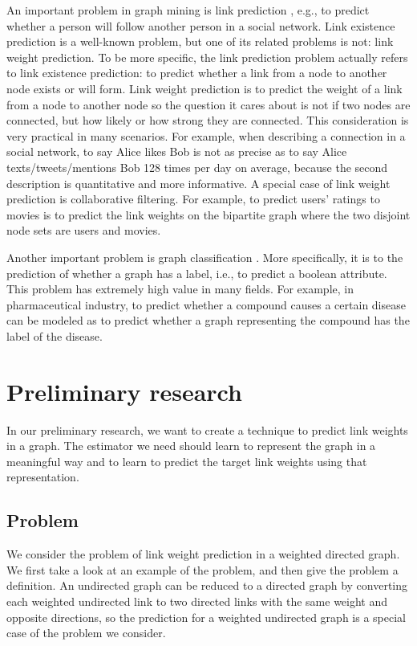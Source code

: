 \documentclass{article}
\begin{document}
An important problem in graph mining is link prediction \cite{liben2007link},
e.g., to predict whether a person will follow another person in a social network.
Link existence prediction is a well-known problem,
but one of its related problems is not: link weight prediction.
To be more specific,
the link prediction problem actually refers to link existence prediction:
to predict whether a link from a node to another node exists or will form.
Link weight prediction is
to predict the weight of a link from a node to another node
so the question it cares about is not if two nodes are connected,
but how likely or how strong they are connected.
This consideration is very practical in many scenarios.
For example, when describing a connection in a social network,
to say Alice likes Bob is not as precise as
to say Alice texts/tweets/mentions Bob 128 times per day on average,
because the second description is quantitative and more informative.
A special case of link weight prediction is collaborative filtering.
For example, to predict users' ratings to movies
is to predict the link weights on the bipartite graph
where the two disjoint node sets are users and movies.

Another important problem is graph classification \cite{duda2012pattern}.
More specifically, it is to the prediction of whether a graph has a label,
i.e., to predict a boolean attribute.
This problem has extremely high value in many fields.
For example, in pharmaceutical industry,
to predict whether a compound causes a certain disease
can be modeled as to predict whether a graph representing the compound
has the label of the disease.

\section{Preliminary research}
In our preliminary research,
we want to create a technique to predict link weights in a graph.
The estimator we need should learn to represent the graph in a meaningful way
and to learn to predict the target link weights using that representation.

\subsection{Problem}
We consider the problem of link weight prediction in a weighted directed graph.
We first take a look at an example of the problem,
and then give the problem a definition.
An undirected graph can be reduced to a directed graph by converting each weighted undirected link to two directed links with the same weight and opposite directions,
so the prediction for a weighted undirected graph is a special case of the problem we consider.
\end{document}
